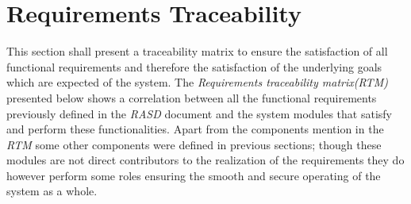 \section{Requirements Traceability}
This section shall present a traceability matrix to ensure the satisfaction of all functional requirements and therefore the satisfaction of the underlying goals which are expected of the system. The \emph{Requirements traceability matrix(RTM)} presented below shows a correlation between all the functional requirements previously defined in the \emph{RASD} document and the system modules that satisfy and perform these functionalities. Apart from the components mention in the \emph{RTM} some other components were defined in previous sections; though these modules are not direct contributors to the realization of the requirements they do however perform some roles ensuring the smooth and secure operating of the system as a whole.


